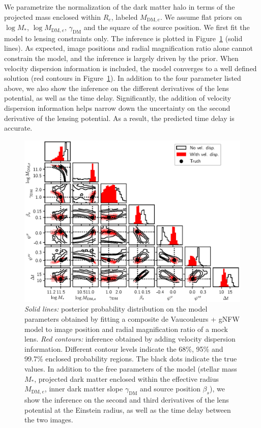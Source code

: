 \documentclass[usenatbib]{mnras}
\def\reff{R_e}
\def\mdme{M_{\mathrm{DM},e}}
\def\gammadm{\gamma_{\mathrm{DM}}}
\def\Fref#1{Figure~\ref{#1}\xspace}
\begin{document}
We parametrize the normalization of the dark matter halo in terms of the projected mass enclosed within $\reff$, labeled $\mdme$.
We assume flat priors on $\log{M_*}$, $\log{\mdme}$, $\gammadm$ and the square of the source position.
We first fit the model to lensing constraints only. The inference is plotted in \Fref{fig:onelens} (solid lines). As expected, image positions and radial magnification ratio alone cannot constrain the model, and the inference is largely driven by the prior.
When velocity dispersion information is included, the model converges to a well defined solution (red contours in \Fref{fig:onelens}).
In addition to the four parameter listed above, we also show the inference on the different derivatives of the lens potential, as well as the time delay.
Significantly, the addition of velocity dispersion information helps narrow down the uncertainty on the second derivative of the lensing potential.
As a result, the predicted time delay is accurate.
%
\begin{figure}
 \includegraphics[width=\textwidth]{gnfw_cornerplot.eps}
 \caption{
{\em Solid lines:} posterior probability distribution on the model parameters obtained by fitting a composite de Vaucouleurs + gNFW model to image position and radial magnification ratio of a mock lens.
{\em Red contours:} inference obtained by adding velocity dispersion information.
Different contour levels indicate the 68\%, 95\% and 99.7\% enclosed probability regions.
The black dots indicate the true values.
In addition to the free parameters of the model (stellar mass $M_*$, projected dark matter enclosed within the effective radius $\mdme$, inner dark matter slope $\gammadm$ and source position $\beta_s$), we show the inference on the second and third derivatives of the lens potential at the Einstein radius, as well as the time delay between the two images.
}
 \label{fig:onelens}
\end{figure}
%
\end{document}
